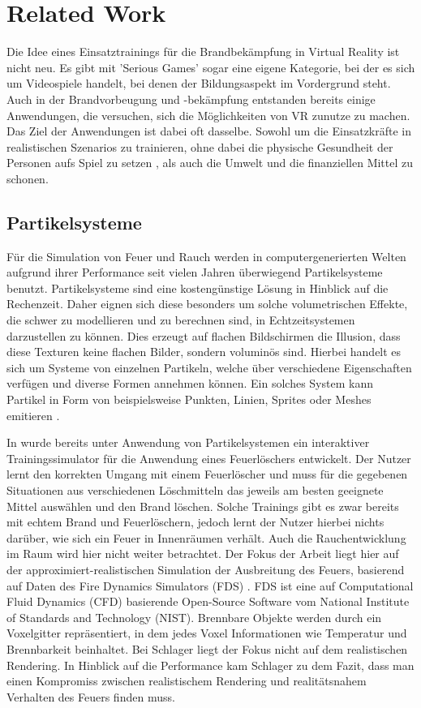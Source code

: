 \section{Related Work}
\label{sec:2}

Die Idee eines Einsatztrainings für die Brandbekämpfung in Virtual Reality ist nicht neu. Es gibt mit
'Serious Games' sogar eine eigene Kategorie, bei der es sich um Videospiele handelt, bei denen der
Bildungsaspekt im Vordergrund steht. Auch in der Brandvorbeugung und -bekämpfung entstanden bereits einige Anwendungen,
die versuchen, sich die Möglichkeiten von VR zunutze zu machen.
Das Ziel der Anwendungen ist dabei oft dasselbe. Sowohl um die Einsatzkräfte in realistischen Szenarios zu trainieren,
ohne dabei die physische Gesundheit der Personen aufs Spiel zu setzen \parencite{WilliamsBell2014} , als auch die Umwelt und die finanziellen Mittel zu schonen.


\subsection{Partikelsysteme}
Für die Simulation von Feuer und Rauch werden in computergenerierten Welten aufgrund ihrer Performance seit vielen Jahren 
überwiegend Partikelsysteme benutzt. 
Partikelsysteme sind eine kostengünstige Lösung in Hinblick auf die Rechenzeit. Daher eignen sich diese besonders um solche
volumetrischen Effekte, die schwer zu modellieren und zu berechnen sind, in Echtzeitsystemen darzustellen zu können. 
Dies erzeugt auf flachen Bildschirmen die Illusion, dass diese Texturen keine flachen Bilder, 
sondern voluminös sind. Hierbei handelt es sich um Systeme von einzelnen Partikeln, welche über verschiedene 
Eigenschaften verfügen und diverse Formen annehmen können. Ein solches System kann Partikel in Form von beispielsweise Punkten, 
Linien, Sprites oder Meshes emitieren \parencite{Reeves1983}.

In \textcite{Schlager2017} wurde bereits unter Anwendung von Partikelsystemen ein interaktiver Trainingssimulator für die Anwendung 
eines Feuerlöschers entwickelt. Der Nutzer lernt den korrekten Umgang mit einem Feuerlöscher und muss für die gegebenen Situationen 
aus verschiedenen Löschmitteln das jeweils am besten geeignete Mittel auswählen und den Brand löschen. Solche Trainings 
gibt es zwar bereits mit echtem Brand und Feuerlöschern, jedoch lernt der Nutzer hierbei nichts darüber, wie sich ein Feuer in 
Innenräumen verhält. Auch die Rauchentwicklung im Raum wird hier nicht weiter betrachtet. Der Fokus der Arbeit liegt hier auf der 
approximiert-realistischen Simulation der Ausbreitung des Feuers, basierend auf Daten des Fire Dynamics Simulators (FDS) \parencite{FDS2004}. 
FDS ist eine auf Computational Fluid Dynamics (CFD) basierende Open-Source Software vom National Institute of Standards and Technology (NIST).
Brennbare Objekte werden durch ein Voxelgitter repräsentiert, in dem jedes Voxel Informationen wie Temperatur und Brennbarkeit beinhaltet.
Bei Schlager liegt der Fokus nicht auf dem realistischen Rendering. 
In Hinblick auf die Performance kam Schlager zu dem Fazit, dass man einen Kompromiss zwischen realistischem Rendering 
und realitätsnahem Verhalten des Feuers finden muss.


